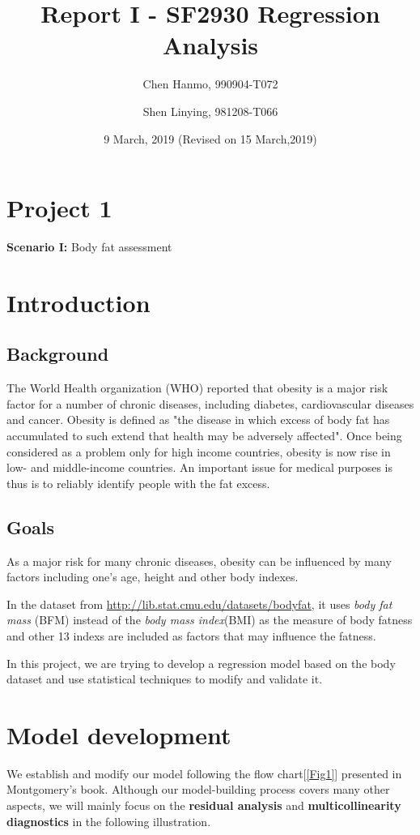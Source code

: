 \documentclass[11pt]{article}
\title{Report I - SF2930 Regression Analysis}
\author{Chen Hanmo, 990904-T072 \and  Shen Linying, 981208-T066}
\date{9 March, 2019 (Revised on 15 March,2019)}
\begin{document}
\maketitle

\tableofcontents
\newpage

\section*{Project 1}


\noindent 
 {\bf Scenario I:}  Body fat assessment

\vspace{2mm}


\section{Introduction}

\subsection{Background} 

The World Health organization (WHO) reported that obesity is a major risk factor for a number of chronic diseases, including diabetes, cardiovascular diseases and cancer. Obesity is defined as "the disease in which excess of body fat has accumulated to such extend that health may be adversely affected". Once being considered as a problem only for high income countries, obesity is now rise in low- and middle-income countries. An important issue for medical purposes is thus is to reliably identify people with the fat excess.


\subsection{Goals}

As a major risk for many chronic diseases, obesity can be influenced by many factors including one's age, height and other body indexes. 

In the dataset from \url{http://lib.stat.cmu.edu/datasets/bodyfat}, it uses {\it body fat mass }(BFM) instead of the {\it body mass index}(BMI) as the measure of body fatness and other 13 indexs are included as factors that may influence the fatness.

In this project, we are trying to develop a regression model based on the body dataset and use statistical techniques to modify and validate it.
\section{Model development} 
We establish and modify our model following the flow chart[\ref{Fig1}] presented in Montgomery's book. Although our model-building process covers many other aspects, we will mainly focus on the {\bf residual analysis} and {\bf multicollinearity diagnostics} in the following illustration.
\end{document}
